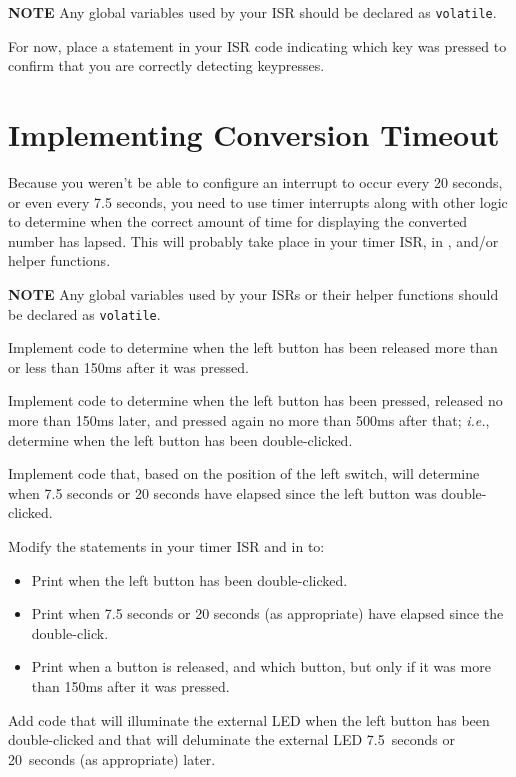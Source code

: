 \textbf{NOTE} Any global variables used by your ISR should be declared as
\lstinline{volatile}.

For now, place a  statement in your ISR code indicating which
key was pressed to confirm that you are correctly detecting keypresses.

\section{Implementing Conversion Timeout}\label{sec:ConversionTimeout}

Because you weren't be able to configure an interrupt to occur every 20 seconds,
or even every 7.5 seconds, you need to use timer interrupts along with other
logic to determine when the correct amount of time for displaying the converted
number has lapsed. This will probably take place in your timer ISR, in
, and/or helper functions.

\textbf{NOTE} Any global variables used by your ISRs or their helper functions
should be declared as \lstinline{volatile}.

Implement code to determine when the left button has been released more than or
less than 150ms after it was pressed.

Implement code to determine when the left button has been pressed, released no
more than 150ms later, and pressed again no more than 500ms after that;
\textit{i.e.}, determine when the left button has been double-clicked.

Implement code that, based on the position of the left switch, will determine
when 7.5 seconds or 20 seconds have elapsed since the left button was
double-clicked.

Modify the  statements in your timer ISR and in
 to:
\begin{itemize}
\item Print when the left button has been double-clicked.
\item Print when 7.5 seconds or 20 seconds (as appropriate) have elapsed since
    the double-click.
\item Print when a button is released, and which button, but only if it was more
    than 150ms after it was pressed.
\end{itemize}

Add code that will illuminate the external LED when the left button has been
double-clicked and that will deluminate the external LED 7.5~seconds or
20~seconds (as appropriate) later.

